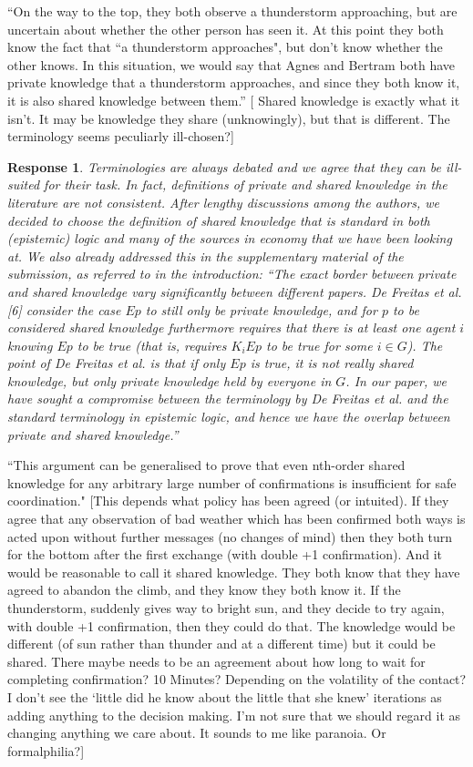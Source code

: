 \documentclass[a4paper]{article}
\newtheorem{response}{Response}
\begin{document}
``On the way to the top, they both observe a thunderstorm approaching, but are uncertain about whether the other person has seen it. At this point they both know the fact that ``a thunderstorm approaches", but don't know whether the other knows. In this situation, we would say that Agnes and Bertram both have private knowledge that a thunderstorm approaches, and since they both know it, it is also shared knowledge between them.''
[ Shared knowledge is exactly what it isn't. It may be knowledge they share (unknowingly), but that is different. The terminology seems peculiarly ill-chosen?]

\begin{response}
Terminologies are always debated and we agree that they can be ill-suited for their task. In fact, definitions of private and shared knowledge in the literature are not consistent. After lengthy discussions among the authors, we decided to choose the definition of shared knowledge that is standard in both (epistemic) logic and many of the sources in economy that we have been looking at. We also already addressed this in the supplementary material of the submission, as referred to in the introduction:  ``The exact border between private and shared knowledge vary significantly between different papers. De Freitas et al. [6] consider the case $Ep$ to still only be private knowledge, and for $p$ to be considered shared knowledge furthermore requires that there is at least one agent $i$ knowing $Ep$ to be true (that is, requires $K_i Ep$ to be true for some $i \in G$). The point of De Freitas et al. is that if only $Ep$ is true, it is not really shared knowledge, but only private knowledge held by everyone in $G$. In our paper, we have sought a compromise between the terminology by De Freitas et al. and the standard terminology in epistemic logic, and hence we have the overlap between private and shared knowledge.''
\end{response}

``This argument can be generalised to prove that even nth-order shared knowledge for any arbitrary large number of confirmations is insufficient for safe coordination." [This depends what policy has been agreed (or intuited). If they agree that any observation of bad weather which has been confirmed both ways is acted upon without further messages (no changes of mind) then they both turn for the bottom after the first exchange (with double +1 confirmation). And it would be reasonable to call it shared knowledge. They both know that they have agreed to abandon the climb, and they know they both know it. If the thunderstorm, suddenly gives way to bright sun, and they decide to try again, with double +1 confirmation, then they could do that. The knowledge would be different (of sun rather than thunder and at a different time) but it could be shared. There maybe needs to be an agreement about how long to wait for completing confirmation? 10 Minutes? Depending on the volatility of the contact? I don't see the `little did he know about the little that she knew' iterations as adding anything to the decision making. I'm not sure that we should regard it as changing anything we care about. It sounds to me like paranoia. Or formalphilia?]
\end{document}
